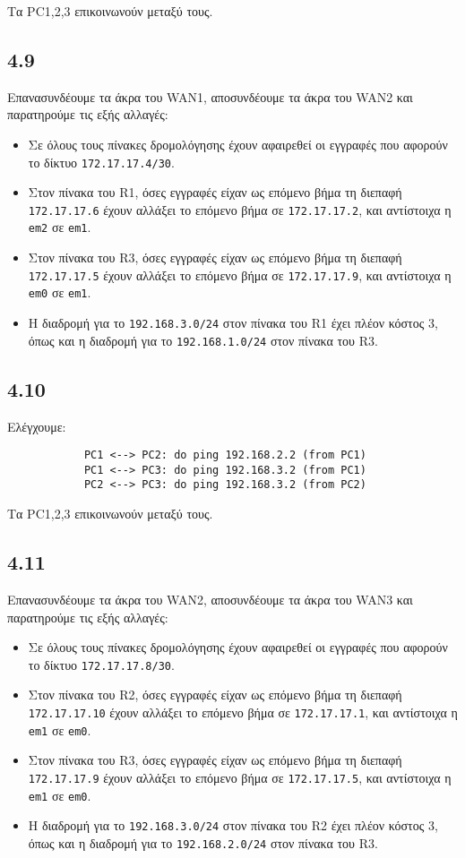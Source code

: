 \documentclass[a4paper, 12pt]{article}
\begin{document}
		Τα PC1,2,3 επικοινωνούν μεταξύ τους.

	\subsection*{4.9}
		Επανασυνδέουμε τα άκρα του WAN1, αποσυνδέουμε τα άκρα του WAN2 και παρατηρούμε τις εξής αλλαγές:
		
		\begin{itemize}
			\item Σε όλους τους πίνακες δρομολόγησης έχουν αφαιρεθεί οι εγγραφές που αφορούν το δίκτυο \verb|172.17.17.4/30|.
			\item Στον πίνακα του R1, όσες εγγραφές είχαν ως επόμενο βήμα τη διεπαφή \verb|172.17.17.6| έχουν αλλάξει το επόμενο βήμα σε \verb|172.17.17.2|, και αντίστοιχα η \verb|em2| σε \verb|em1|.
			\item Στον πίνακα του R3, όσες εγγραφές είχαν ως επόμενο βήμα τη διεπαφή \verb|172.17.17.5| έχουν αλλάξει το επόμενο βήμα σε \verb|172.17.17.9|, και αντίστοιχα η \verb|em0| σε \verb|em1|. 
			\item Η διαδρομή για το \verb|192.168.3.0/24| στον πίνακα του R1 έχει πλέον κόστος 3, όπως και η διαδρομή για το \verb|192.168.1.0/24| στον πίνακα του R3.
		\end{itemize}

	\subsection*{4.10}
		Ελέγχουμε:
		
		\begin{verbatim}
			PC1 <--> PC2: do ping 192.168.2.2 (from PC1)
			PC1 <--> PC3: do ping 192.168.3.2 (from PC1)
			PC2 <--> PC3: do ping 192.168.3.2 (from PC2)
		\end{verbatim}
		
		Τα PC1,2,3 επικοινωνούν μεταξύ τους.

	\subsection*{4.11}
		Επανασυνδέουμε τα άκρα του WAN2, αποσυνδέουμε τα άκρα του WAN3 και παρατηρούμε τις εξής αλλαγές:
		
		\begin{itemize}
			\item Σε όλους τους πίνακες δρομολόγησης έχουν αφαιρεθεί οι εγγραφές που αφορούν το δίκτυο \verb|172.17.17.8/30|.
			\item Στον πίνακα του R2, όσες εγγραφές είχαν ως επόμενο βήμα τη διεπαφή \verb|172.17.17.10| έχουν αλλάξει το επόμενο βήμα σε \verb|172.17.17.1|, και αντίστοιχα η \verb|em1| σε \verb|em0|.
			\item Στον πίνακα του R3, όσες εγγραφές είχαν ως επόμενο βήμα τη διεπαφή \verb|172.17.17.9| έχουν αλλάξει το επόμενο βήμα σε \verb|172.17.17.5|, και αντίστοιχα η \verb|em1| σε \verb|em0|. 
			\item Η διαδρομή για το \verb|192.168.3.0/24| στον πίνακα του R2 έχει πλέον κόστος 3, όπως και η διαδρομή για το \verb|192.168.2.0/24| στον πίνακα του R3.
		\end{itemize}
\end{document}
